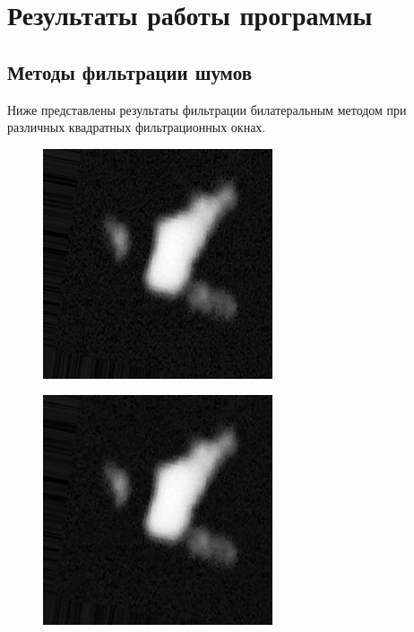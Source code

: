 \chapter{Результаты работы программы}

\section{Методы фильтрации шумов}

Ниже представлены результаты фильтрации билатеральным методом при различных квадратных фильтрационных окнах.

\begin{figure}[h!]
	\centering
	\begin{minipage}{.5\textwidth}
		\centering
		\includegraphics[width=0.8\linewidth]{inc/img/nc_original}
		\label{fig:nc_original_0}
	\end{minipage}%
	\begin{minipage}{.5\textwidth}
		\centering
		\includegraphics[width=0.8\linewidth]{inc/img/nc_b_s3}
		\label{fig:nc_b_s3}
	\end{minipage}
\end{figure}

